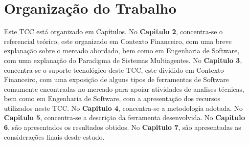 \section{Organização do Trabalho}

Este TCC está organizado em Capítulos. No \textbf{Capitulo 2}, concentra-se o referencial teórico, este organizado em Contexto Financeiro, com uma breve explanação sobre o mercado abordado, bem como em Engenharia de Software, com uma explanação do Paradigma de Sistemas Multiagentes. No \textbf{Capitulo 3}, concentra-se o suporte tecnológico deste TCC, este dividido em Contexto Financeiro, com uma exposição de alguns tipos de ferramentas de Software comumente encontradas no mercado para apoiar atividades de analises técnicas, bem como em Engenharia de Software, com a apresentação dos recursos utilizados neste TCC. No \textbf{Capitulo 4}, concentra-se a metodologia adotada. No \textbf{Capitulo 5}, concentra-se a descrição da ferramenta desenvolvida. No \textbf{Capitulo 6}, são apresentados os resultados obtidos. No \textbf{Capitulo 7}, são apresentadas as considerações finais desde estudo.




